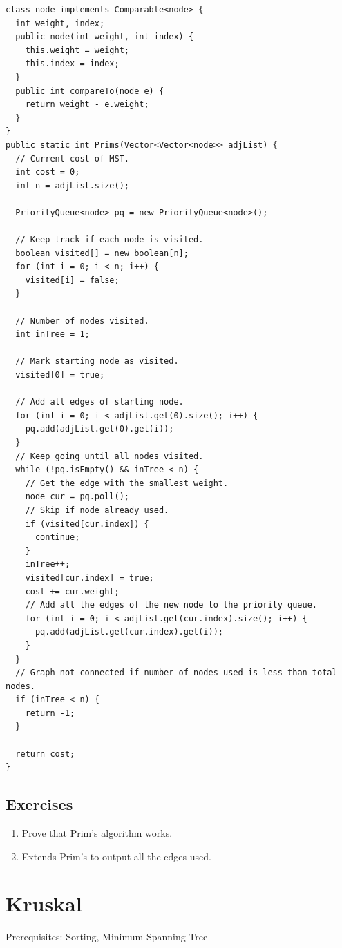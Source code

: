 \documentclass[11pt,oneside]{book}
\begin{document}
\begin{lstlisting}
class node implements Comparable<node> {
  int weight, index;
  public node(int weight, int index) {
    this.weight = weight;
    this.index = index;
  }
  public int compareTo(node e) {
    return weight - e.weight;
  }
}
public static int Prims(Vector<Vector<node>> adjList) {
  // Current cost of MST.
  int cost = 0;
  int n = adjList.size();
  
  PriorityQueue<node> pq = new PriorityQueue<node>();
  
  // Keep track if each node is visited.
  boolean visited[] = new boolean[n];
  for (int i = 0; i < n; i++) {
    visited[i] = false;
  }
  
  // Number of nodes visited.
  int inTree = 1;
  
  // Mark starting node as visited.
  visited[0] = true;
  
  // Add all edges of starting node.
  for (int i = 0; i < adjList.get(0).size(); i++) {
    pq.add(adjList.get(0).get(i));
  }
  // Keep going until all nodes visited.
  while (!pq.isEmpty() && inTree < n) {
    // Get the edge with the smallest weight.
    node cur = pq.poll();
    // Skip if node already used.
    if (visited[cur.index]) {
      continue;
    }
    inTree++;
    visited[cur.index] = true;
    cost += cur.weight;
    // Add all the edges of the new node to the priority queue.
    for (int i = 0; i < adjList.get(cur.index).size(); i++) {
      pq.add(adjList.get(cur.index).get(i));
    }
  }
  // Graph not connected if number of nodes used is less than total nodes.
  if (inTree < n) {
    return -1;
  }

  return cost;
}
\end{lstlisting}

\subsection{Exercises}

\begin{enumerate}
\item Prove that Prim's algorithm works.
\item Extends Prim's to output all the edges used.
\end{enumerate}

        \section{ Kruskal }
        

Prerequisites:  Sorting, Minimum Spanning Tree
\end{document}
